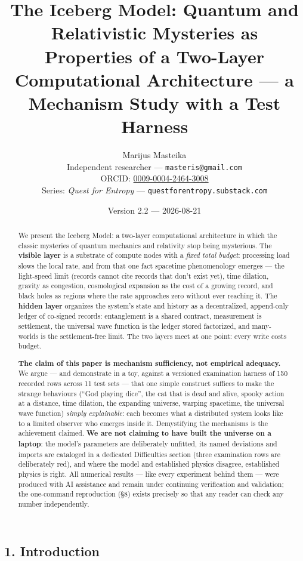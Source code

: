 \documentclass[
  11pt,
]{article}
\title{The Iceberg Model: Quantum and Relativistic Mysteries as
Properties of a Two-Layer Computational Architecture --- a Mechanism
Study with a Test Harness}
\author{Marijus Masteika\\[2pt]\small Independent researcher --- \texttt{masteris@gmail.com}\\\small ORCID: \href{https://orcid.org/0009-0004-2464-3008}{0009-0004-2464-3008}\\\small Series: \emph{Quest for Entropy} --- \texttt{questforentropy.substack.com}}
\date{Version 2.2 --- 2026-08-21}
\begin{document}
\maketitle
\begin{abstract}
We present the Iceberg Model: a two-layer computational architecture in
which the classic mysteries of quantum mechanics and relativity stop
being mysterious. The \textbf{visible layer} is a substrate of compute
nodes with a \emph{fixed total budget}: processing load slows the local
rate, and from that one fact spacetime phenomenology emerges --- the
light-speed limit (records cannot cite records that don't exist yet),
time dilation, gravity as congestion, cosmological expansion as the cost
of a growing record, and black holes as regions where the rate
approaches zero without ever reaching it. The \textbf{hidden layer}
organizes the system's state and history as a decentralized, append-only
ledger of co-signed records: entanglement is a shared contract,
measurement is settlement, the universal wave function is the ledger
stored factorized, and many-worlds is the settlement-free limit. The two
layers meet at one point: every write costs budget.

\textbf{The claim of this paper is mechanism sufficiency, not empirical
adequacy.} We argue --- and demonstrate in a toy, against a versioned
examination harness of 150 recorded rows across 11 test sets --- that
one simple construct suffices to make the strange behaviours (``God
playing dice'', the cat that is dead and alive, spooky action at a
distance, time dilation, the expanding universe, warping spacetime, the
universal wave function) \emph{simply explainable}: each becomes what a
distributed system looks like to a limited observer who emerges inside
it. Demystifying the mechanisms is the achievement claimed. \textbf{We
are not claiming to have built the universe on a laptop}: the model's
parameters are deliberately unfitted, its named deviations and imports
are cataloged in a dedicated Difficulties section (three examination
rows are deliberately red), and where the model and established physics
disagree, established physics is right. All numerical results --- like
every experiment behind them --- were produced with AI assistance and
remain under continuing verification and validation; the one-command
reproduction (\S{}8) exists precisely so that any reader can check any
number independently.
\end{abstract}

\subsection{1. Introduction}\label{introduction}
\end{document}

